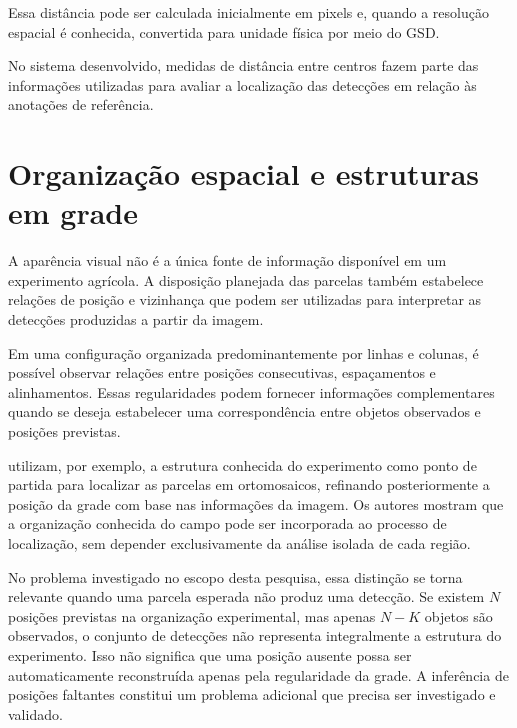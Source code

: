 Essa dist\^ancia pode ser calculada inicialmente em pixels e, quando a resolu\c{c}\~ao espacial \'e conhecida, convertida para unidade f\'isica por meio do GSD.

No sistema desenvolvido, medidas de dist\^ancia entre centros fazem parte das informa\c{c}\~oes utilizadas para avaliar a localiza\c{c}\~ao das detec\c{c}\~oes em rela\c{c}\~ao \`as anota\c{c}\~oes de refer\^encia.

\section{Organiza\c{c}\~ao espacial e estruturas em grade}
\label{sec:organizacao-espacial-grade}

A apar\^encia visual n\~ao \'e a \'unica fonte de informa\c{c}\~ao dispon\'ivel em um experimento agr\'icola. A disposi\c{c}\~ao planejada das parcelas tamb\'em estabelece rela\c{c}\~oes de posi\c{c}\~ao e vizinhan\c{c}a que podem ser utilizadas para interpretar as detec\c{c}\~oes produzidas a partir da imagem.

Em uma configura\c{c}\~ao organizada predominantemente por linhas e colunas, \'e poss\'ivel observar rela\c{c}\~oes entre posi\c{c}\~oes consecutivas, espa\c{c}amentos e alinhamentos. Essas regularidades podem fornecer informa\c{c}\~oes complementares quando se deseja estabelecer uma correspond\^encia entre objetos observados e posi\c{c}\~oes previstas.

\citet{mardanisamani2021} utilizam, por exemplo, a estrutura conhecida do experimento como ponto de partida para localizar as parcelas em ortomosaicos, refinando posteriormente a posi\c{c}\~ao da grade com base nas informa\c{c}\~oes da imagem. Os autores mostram que a organiza\c{c}\~ao conhecida do campo pode ser incorporada ao processo de localiza\c{c}\~ao, sem depender exclusivamente da an\'alise isolada de cada regi\~ao.

No problema investigado no escopo desta pesquisa, essa distin\c{c}\~ao se torna relevante quando uma parcela esperada n\~ao produz uma detec\c{c}\~ao. Se existem $N$ posi\c{c}\~oes previstas na organiza\c{c}\~ao experimental, mas apenas $N-K$ objetos s\~ao observados, o conjunto de detec\c{c}\~oes n\~ao representa integralmente a estrutura do experimento. Isso n\~ao significa que uma posi\c{c}\~ao ausente possa ser automaticamente reconstru\'ida apenas pela regularidade da grade. A infer\^encia de posi\c{c}\~oes faltantes constitui um problema adicional que precisa ser investigado e validado.

